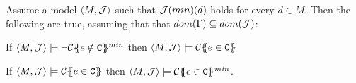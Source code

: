 \begin{lemma}\label{lem:contract-min} Assume a model $\langle M,{\cal J}\rangle$ such that ${\cal J}(min)(d)$ holds for every $d \in M$. 
Then the following are true, assuming that that $dom(\Gamma) \subseteq dom({\cal J})$:
\begin{itemize*} 
  \item If $\langle M,{\cal J}\rangle \models \neg {\cal C}\{\!\!\{e \notin {\tt C}\}\!\!\}^{min}$ then $\langle M,{\cal J}\rangle\models {\cal C}\{\!\!\{e \in {\tt C}\}\!\!\}$
  \item If $\langle M,{\cal J}\rangle \models {\cal C}\{\!\!\{e \in {\tt C}\}\!\!\}$ then $\langle M,{\cal J}\rangle \models {\cal C}\{\!\!\{e \in {\tt C}\}\!\!\}^{min}$.
\end{itemize*}
\end{lemma}

